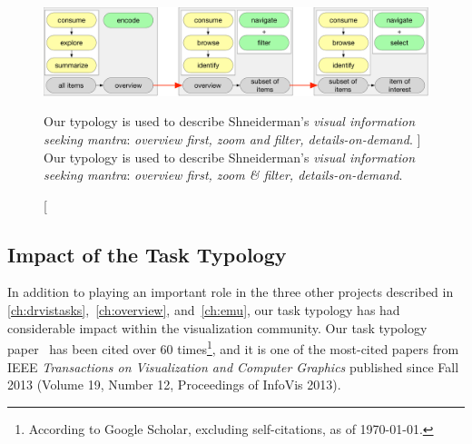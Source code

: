 
\begin{figure}[ht!]
	\centering
    \includegraphics[width=\textwidth]{figures/typology-mantra.pdf}
    \caption
    [
        Our typology is used to describe Shneiderman's {\it visual information seeking mantra}: {\it overview first, zoom and filter, details-on-demand}.
    ]
    {
        Our typology is used to describe Shneiderman's {\it visual information seeking mantra}: {\it overview first, zoom \& filter, details-on-demand}.
    }
	\centering
	\label{fig:typology-mantra}
\end{figure}



\subsection{Impact of the Task Typology}
\label{conclusions:typology:adoption}


In addition to playing an important role in the three other projects described in \autoref{ch:drvistasks},~\ref{ch:overview}, and~\ref{ch:emu}, our task typology has had considerable impact within the visualization community.
Our task typology paper~\cite{Brehmer2013} has been cited over 60 times\footnote{According to Google Scholar, excluding self-citations, as of \today.}, and it is one of the most-cited papers from IEEE {\it Transactions on Visualization and Computer Graphics} published since Fall 2013 (Volume 19, Number 12, Proceedings of InfoVis 2013).

